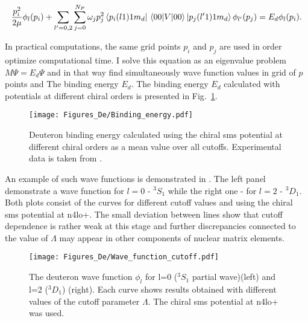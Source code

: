     
    \begin{equation}
        \frac{p_i^2}{2\mu} \phi_l(p_i) +
        \sum_{l^\prime =0,2}\sum_{j =0}^{N_P}  \omega_j p^{2}_j 
        \bra{p_i(l1)1m_d} \matrixel{00}{V}{00} \ket{p_j(l^\prime1)1m_d}
        \phi_{l^\prime}(p_j) = 
        E_d \phi_l(p_i).
        \label{integral2}
    \end{equation}

    In practical computations, the same grid points $p_i$ and $p_j$ are used in order
    optimize computational time. 
    I solve this equation as an eigenvalue problem $M\Psi = E_d \Psi$ and
    in that way
    find simultaneously wave function values in grid of $p$ points and The binding energy $E_d$. 
    The binding energy $E_d$ calculated with potentials at different chiral orders 
    is presented in Fig.~\ref{bind}.

    \begin{figure}[h]
        \begin{center}
            \texttt{[image: Figures\_De/Binding\_energy.pdf]}
        \end{center}
        \caption{Deuteron binding energy calculated using the chiral \gls{sms} potential
        at different chiral orders as a mean value over all cutoffs.
        Experimental data is taken from \cite{VANDERLEUN1982261}.}
        \label{bind}
    \end{figure}

    An example of such wave functions is demonstrated in . The left panel demonstrate
    a wave function for $l=0$ - $^3S_1$ while the right one - for $l=2$ - $^3D_1$. Both 
    plots consist of the curves for different cutoff values and using the chiral \gls{sms} potential at \gls{n4lo+}.
    The small deviation between lines show that cutoff dependence is rather weak at this stage
    and further discrepancies connected to the value of $\Lambda$ may appear in other components
    of nuclear matrix elements.  

    \begin{figure}[h]
        \begin{center}
            \texttt{[image: Figures\_De/Wave\_function\_cutoff.pdf]}
        \end{center}
        \caption{The deuteron wave function $\phi_l$ for l=0 ($^3S_1$ partial wave)(left) and l=2 ($^3D_1$) (right).
        Each curve shows results obtained with different values of the cutoff parameter $\Lambda$. 
        The chiral \gls{sms} potential at \gls{n4lo+} was used.}
        \label{wave_func}
    \end{figure}

